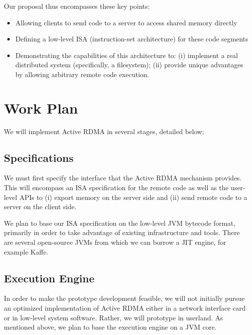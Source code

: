 \documentclass[10pt]{article}
\begin{document}
Our proposal thus encompasses these key points:

\begin{itemize} \itemsep -2pt

\item Allowing clients to send code to a server to access shared
  memory directly

\item Defining a low-level ISA (instruction-set architecture) for
  these code segments

\item Demonstrating the capabilities of this architecture to: (i)
  implement a real distributed system (specifically, a filesystem);
  (ii) provide unique advantages by allowing arbitrary remote code
  execution.

\end{itemize}

\section{Work Plan}

We will implement Active RDMA in several stages, detailed below:

\subsection{Specifications}

We must first specify the interface that the Active RDMA mechanism
provides. This will encompass an ISA specification for the remote code
as well as the user-level APIs to (i) export memory on the server side
and (ii) send remote code to a server on the client side.

We plan to base our ISA specification on the low-level JVM bytecode
format, primarily in order to take advantage of existing
infrastructure and tools. There are several open-source JVMs from
which we can borrow a JIT engine, for example Kaffe.

\subsection{Execution Engine}

In order to make the prototype development feasible, we will not
initially pursue an optimized implementation of Active RDMA either in
a network interface card or in low-level system software. Rather, we
will prototype in userland. As mentioned above, we plan to base the
execution engine on a JVM core.
\end{document}
